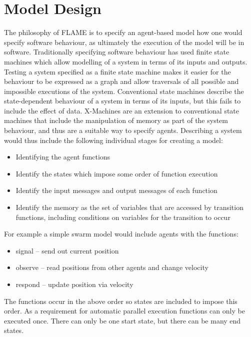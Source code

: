 \section{Model Design}
\label{model_design}

The philosophy of FLAME is to specify an agent-based model how one would
specify software behaviour, as ultimately the execution of the model will be in
software. Traditionally specifying software behaviour has used finite state
machines which allow modelling of a system in terms of its inputs and outputs.
Testing a system specified as a finite state machine makes it easier for the behaviour to be expressed as a graph
and allow traversals of all possible and impossible executions of the system.
Conventional state machines describe the state-dependent behaviour of a system 
in terms of its inputs, but this fails to include the effect of data.
X-Machines are an extension to conventional state machines that
include the manipulation of memory as part of the system behaviour,
and thus are a suitable way to specify agents.
Describing a system would thus include the following individual
stages for creating a model:

\begin{itemize}
\item Identifying the agent functions
\item Identify the states which impose some order of function execution
\item Identify the input messages and output messages of each function
\item Identify the memory as the set of variables that are accessed by
transition functions, including conditions on variables for the transition to
occur
\end{itemize}

For example a simple swarm model would include agents with the functions:

\begin{itemize}
\item signal -- send out current position
\item observe -- read positions from other agents and change velocity
\item respond -- update position via velocity
\end{itemize}

The functions occur in the above order so states are included to impose this
order. As a requirement for automatic parallel execution functions can only be
executed once. There can only be one start state, but there can be many end
states.

